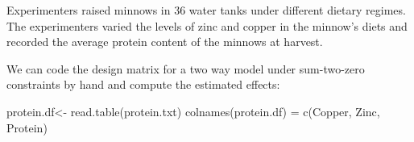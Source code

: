 \documentclass[
]{book}
\newenvironment{Shaded}{\begin{snugshade}}{\end{snugshade}}
\newcommand{\FunctionTok}[1]{\textcolor[rgb]{0.00,0.00,0.00}{#1}}
\newcommand{\NormalTok}[1]{#1}
\newcommand{\OtherTok}[1]{\textcolor[rgb]{0.56,0.35,0.01}{#1}}
\newcommand{\StringTok}[1]{\textcolor[rgb]{0.31,0.60,0.02}{#1}}
\begin{document}
Experimenters raised minnows in 36 water tanks under different dietary regimes. The experimenters varied the levels of zinc and copper in the minnow's diets and recorded the average protein content of the minnows at harvest.

We can code the design matrix for a two way model under sum-two-zero constraints by hand and compute the estimated effects:

\begin{Shaded}
\begin{Highlighting}[]
\NormalTok{protein.df}\OtherTok{\textless{}{-}} \FunctionTok{read.table}\NormalTok{(}\StringTok{\textquotesingle{}protein.txt\textquotesingle{}}\NormalTok{)}
\FunctionTok{colnames}\NormalTok{(protein.df) }\OtherTok{=} \FunctionTok{c}\NormalTok{(}\StringTok{\textquotesingle{}Copper\textquotesingle{}}\NormalTok{, }\StringTok{\textquotesingle{}Zinc\textquotesingle{}}\NormalTok{, }\StringTok{\textquotesingle{}Protein\textquotesingle{}}\NormalTok{)}


\end{Highlighting}
\end{Shaded}
\end{document}
